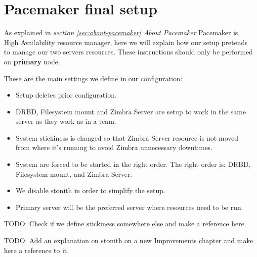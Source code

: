 
\section {\label{sec:pacemaker-final-setup}Pacemaker final setup}
As explained in \textit{section \ref{sec:about-pacemaker} About Pacemaker} Pacemaker is High Availability resource manager, here we will explain how our setup pretends to manage our two servers resources. These instructions should only be performed on \textbf{primary} node.

These are the main settings we define in our configuration:
\begin{itemize}
  \item Setup deletes prior configuration.
  \item DRBD, Filesystem mount and Zimbra Server are setup to work in the same server as they work as in a team.
  \item System stickiness is changed so that Zimbra Server resource is not moved from where it's running to avoid Zimbra unnecessary downtimes.
  \item System are forced to be started in the right order. The right order is: DRBD, Filesystem mount, and Zimbra Server.
  \item We disable stonith in order to simplify the setup.
  \item Primary server will be the preferred server where resources need to be run.
\end{itemize}

TODO: Check if we define stickiness somewhere else and make a reference here.

TODO: Add an explanation on stonith on a new Improvements chapter and make here a reference to it.


